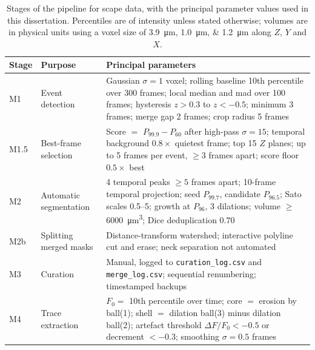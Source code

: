 			\begin{table}[htbp]
				\centering
				\caption[\mavca{} pipeline stages and parameters]{
					Stages of the \mavca{} pipeline for \acrshort{scape} data,
					with the principal parameter values used in this
					dissertation. Percentiles are of intensity unless stated
					otherwise; volumes are in physical units using a voxel size
					of \SIlist{3.9;1.0;1.2}{\micro\meter} along $Z$, $Y$ and
					$X$.
				}\label{table:methods:mavca}
				\begin{singlespace}
				\begin{tabular}{@{}llp{}@{}}
					\toprule
					Stage & Purpose & Principal parameters \\
					\midrule
					M1   & Event detection
					     & Gaussian $\sigma = 1$ voxel; rolling baseline 10th
					       percentile over 300 frames; local median and
					       \acrshort{mad} over 100 frames; hysteresis
					       $z > 0.3$ to $z < -0.5$; minimum 3 frames; merge gap
					       2 frames; crop radius 5 frames \\
					\addlinespace
					M1.5 & Best-frame selection
					     & Score $=$ $P_{99.9} - P_{60}$ after high-pass
					       $\sigma = 15$; temporal background $0.8\times$
					       quietest frame; top 15 $Z$ planes; up to 5 frames per
					       event, $\geq 3$ frames apart; score floor $0.5\times$
					       best \\
					\addlinespace
					M2   & Automatic segmentation
					     & 4 temporal peaks $\geq 5$ frames apart; 10-frame
					       temporal projection; seed $P_{99.7}$, candidate
					       $P_{96.5}$; Sato scales 0.5--5; growth at $P_{96}$,
					       3 dilations; volume $\geq$
					       \SI{6000}{\micro\meter\cubed}; Dice deduplication
					       $0.70$ \\
					\addlinespace
					M2b  & Splitting merged masks
					     & Distance-transform watershed; interactive polyline
					       cut and erase; neck separation not automated \\
					\addlinespace
					M3   & Curation
					     & Manual, logged to \texttt{curation\_log.csv} and
					       \texttt{merge\_log.csv}; sequential renumbering;
					       timestamped backups \\
					\addlinespace
					M4   & Trace extraction
					     & $F_0 =$ 10th percentile over time; core $=$ erosion
					       by ball(1); shell $=$ dilation ball(3) minus
					       dilation ball(2); artefact threshold
					       $\Delta F/F_0 < -0.5$ or decrement $< -0.3$;
					       smoothing $\sigma = 0.5$ frames \\
					\bottomrule
				\end{tabular}
				\end{singlespace}
			\end{table}

